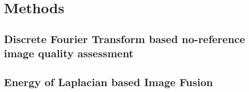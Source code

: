 


\section{Methods}

\subsection{Discrete Fourier Transform based no-reference image quality assessment}


\subsection{Energy of Laplacian based Image Fusion}



